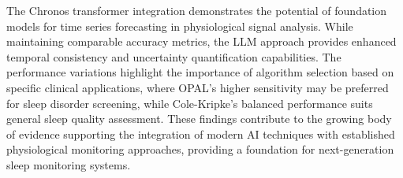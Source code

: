 \documentclass[conference]{IEEEtran}
\begin{document}
The Chronos transformer integration demonstrates the potential of foundation models for time series forecasting in physiological signal analysis. While maintaining comparable accuracy metrics, the LLM approach provides enhanced temporal consistency and uncertainty quantification capabilities. The performance variations highlight the importance of algorithm selection based on specific clinical applications, where OPAL's higher sensitivity may be preferred for sleep disorder screening, while Cole-Kripke's balanced performance suits general sleep quality assessment. These findings contribute to the growing body of evidence supporting the integration of modern AI techniques with established physiological monitoring approaches, providing a foundation for next-generation sleep monitoring systems.





\end{document}
